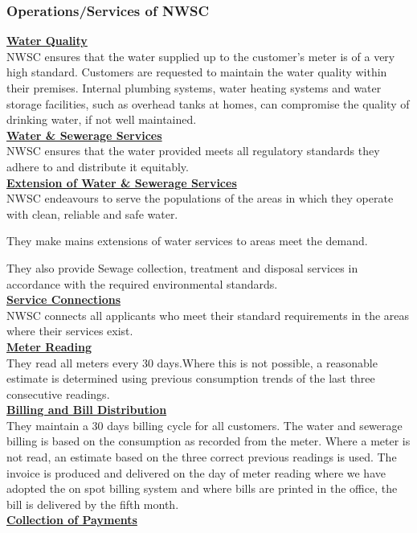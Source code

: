 \documentclass{article}
\begin{document}
\subsubsection{Operations/Services of NWSC}
\underline{\textbf{Water Quality}}\\ 
NWSC ensures that the water supplied up to the customer's meter is of a very high standard. Customers are requested to maintain the water quality within their premises. Internal plumbing systems, water heating systems and water storage facilities, such as overhead tanks at homes, can compromise the quality of drinking water, if not well maintained.\\
\underline{\textbf{Water \& Sewerage Services}}\\ 
NWSC ensures that the water  provided meets all regulatory standards they adhere to and distribute it equitably.\\
\underline{\textbf{Extension of Water \& Sewerage Services}}\\ 
NWSC endeavours to serve the populations of the areas in which they operate with clean, reliable and safe water.\par They make mains extensions of water services to areas meet the demand.\par They also provide Sewage collection, treatment and disposal services in accordance with the required environmental standards.\\  
\underline{\textbf{Service Connections}}\\ 
NWSC connects all applicants who meet their standard requirements in the areas where their services exist.\\
\underline{\textbf{Meter Reading}}\\
They read all meters every 30 days.Where this is not possible, a  reasonable estimate is determined using previous consumption trends of the last three consecutive readings.\\
\underline{\textbf{Billing and Bill Distribution}}\\
They maintain a 30 days billing cycle for all customers. The water and sewerage billing is based on the consumption as recorded from the meter. Where a meter is not read, an estimate based on the three correct previous readings is used. The invoice is produced and delivered on the day of meter reading where we have adopted the on spot billing system and where bills are printed in the office, the bill is delivered by the fifth month.\\
\underline{\textbf{Collection of Payments}}\\
\end{document}
